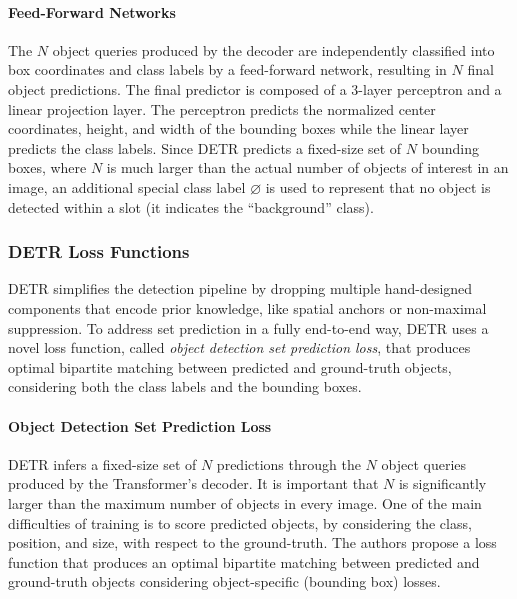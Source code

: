 \paragraph{Feed-Forward Networks} The $N$ object queries produced by the decoder are  independently classified into box coordinates and class labels by
a feed-forward network, resulting in $N$ final object predictions. The final predictor is composed of a 3-layer perceptron and a linear projection layer. The perceptron predicts the normalized center coordinates, height, and width of the bounding boxes while the linear layer predicts the class labels. Since DETR predicts a
fixed-size set of $N$ bounding boxes, where $N$ is much larger than the
actual number of objects of interest in an image, an additional special class label $\varnothing$ is used to represent that no object is detected within a slot (it indicates the ``background'' class).

\subsubsection{DETR Loss Functions}
\label{sec:detrlosses}

DETR \cite{detr} simplifies the detection pipeline by dropping multiple hand-designed components that encode prior knowledge, like spatial anchors or non-maximal suppression. To address set prediction in a fully end-to-end way, DETR uses a novel loss function, called \textit{object detection set prediction loss}, that produces
optimal bipartite matching between predicted and ground-truth objects, considering both the class labels and the bounding boxes.

\paragraph{Object Detection Set Prediction Loss} DETR \cite{detr} infers a fixed-size set of $N$ predictions through the $N$ object queries produced by the Transformer's decoder. It is important that $N$ is significantly larger than the maximum number of objects in every image. One of the main difficulties of training is to score predicted objects, by considering the class, position, and size, with respect to the ground-truth. The authors propose a loss function that produces
an optimal bipartite matching between predicted and ground-truth objects considering object-specific (bounding box) losses. 

